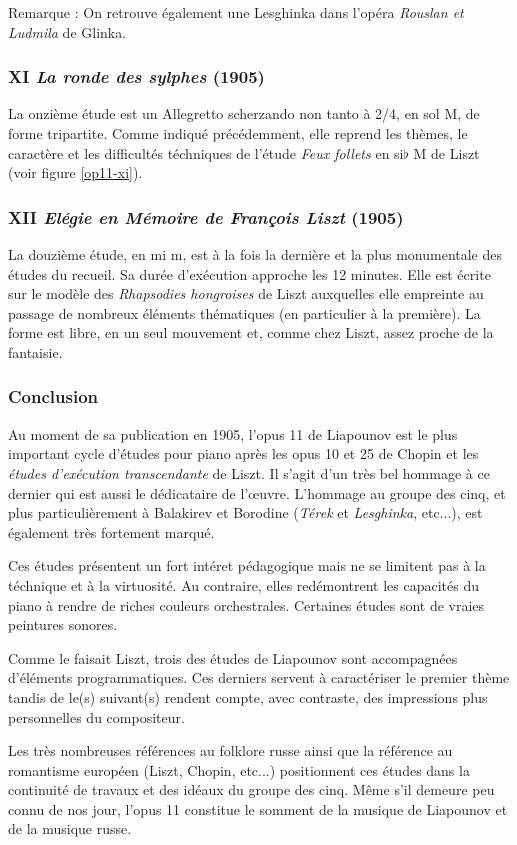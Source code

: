 Remarque : On retrouve également une Lesghinka dans l'opéra \emph{Rouslan et Ludmila} de Glinka.

\newpage

\subsubsection{XI \emph{La ronde des sylphes} (1905)}

La onzième étude est un Allegretto scherzando non tanto à 2/4, en sol M, de forme tripartite. Comme indiqué précédemment, elle reprend les thèmes, le caractère et les difficultés téchniques de l'étude \emph{Feux follets} en si$\flat$ M de Liszt (voir figure \ref{op11-xi}).

\subsubsection{XII \emph{Elégie en Mémoire de François Liszt} (1905)}

La douzième étude, en mi m, est à la fois la dernière et la plus monumentale des études du recueil. Sa durée d'exécution approche les 12 minutes. Elle est écrite sur le modèle des \emph{Rhapsodies hongroises} de Liszt auxquelles elle empreinte au passage de nombreux éléments thématiques (en particulier à la première). La forme est libre, en un seul mouvement et, comme chez Liszt, assez proche de la fantaisie.

\subsubsection{Conclusion}

Au moment de sa publication en 1905, l'opus 11 de Liapounov est le plus important cycle d'études pour piano après les opus 10 et 25 de Chopin et les \emph{études d'exécution transcendante} de Liszt. Il s'agit d'un très bel hommage à ce dernier qui est aussi le dédicataire de l'œuvre. L'hommage au groupe des cinq, et plus particulièrement à Balakirev et Borodine (\emph{Térek} et \emph{Lesghinka}, etc...), est également très fortement marqué.

Ces études présentent un fort intéret pédagogique mais ne se limitent pas à la téchnique et à la virtuosité. Au contraire, elles redémontrent les capacités du piano à rendre de riches couleurs orchestrales. Certaines études sont de vraies peintures sonores.

Comme le faisait Liszt, trois des études de Liapounov sont accompagnées d'éléments programmatiques. Ces derniers servent à caractériser le premier thème tandis de le(s) suivant(s) rendent compte, avec contraste, des impressions plus personnelles du compositeur.

Les très nombreuses références au folklore russe ainsi que la référence au romantisme européen (Liszt, Chopin, etc...) positionnent ces études dans la continuité de travaux et des idéaux du groupe des cinq. Même s'il demeure peu connu de nos jour, l'opus 11 constitue le somment de la musique de Liapounov et de la musique russe.

